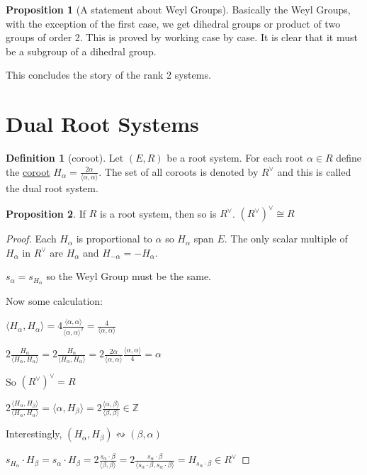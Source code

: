 \documentclass{article}
\theoremstyle{definition}
\newtheorem{definition}{Definition}
\newtheorem{proposition}{Proposition}
\begin{document}
\begin{proposition}
    [A statement about Weyl Groups] Basically the Weyl Groups, with the exception of the first case, we get dihedral groups or product of two groups of order 2. This is proved by working case by case. It is clear that it must be a subgroup of a dihedral group.
\end{proposition}

This concludes the story of the rank 2 systems.

\section*{Dual Root Systems}

\begin{definition}
    [coroot] Let \((E,R)\) be a root system. For each root \(\alpha \in R\) define the \underline{coroot} \(H_\alpha  = \frac{2\alpha}{\langle \alpha ,\alpha  \rangle }\). The set of all coroots is denoted by \(R^\vee\) and this is called the dual root system.
\end{definition}

\begin{proposition}
    If \(R\) is a root system, then so is \(R^\vee\). \((R^\vee)^\vee\cong R\)  
\end{proposition}

\begin{proof}
    Each \(H_\alpha \) is proportional to \(\alpha \) so \(H_\alpha \) span \(E\). The only scalar multiple of \(H_{\alpha} \) in \(R^\vee\) are \(H_\alpha \) and \(H_{-\alpha}=-H_\alpha\).

    \(s_\alpha = s_{H_\alpha}\) so the Weyl Group must be the same.

    Now some calculation:

    \(\langle H_\alpha ,H_\alpha \rangle = 4\frac{\langle \alpha ,\alpha  \rangle }{\langle \alpha ,\alpha  \rangle ^2}=\frac{4}{\langle \alpha ,\alpha  \rangle }\)
    
    \(2 \frac{H_\alpha}{\langle H_\alpha ,H_\alpha \rangle }= 2 \frac{H_\alpha}{\langle H_\alpha,H_\alpha \rangle }=2\frac{2\alpha}{\langle \alpha ,\alpha \rangle }\frac{\langle \alpha ,\alpha  \rangle }{4}=\alpha\) 

    So \((R^\vee)^\vee = R\)
    
    \(2\frac{\langle H_\alpha,H_\beta \rangle}{\langle H_\alpha ,H_\alpha \rangle }= \langle \alpha ,H_\beta \rangle = 2\frac{\langle \alpha ,\beta \rangle }{\langle \beta ,\beta  \rangle }\in\mathbb{Z}\) 

    Interestingly, \((H_\alpha ,H_\beta )\leftrightsquigarrow (\beta ,\alpha)\) 

    \(s_{H_\alpha}\cdot H_\beta =s_{\alpha}\cdot H_\beta=2\frac{s_\alpha \cdot \beta}{\langle \beta ,\beta  \rangle }=2 \frac{s_\alpha\cdot \beta}{\langle s_\alpha \cdot \beta , s_\alpha \cdot \beta \rangle }=H_{s_\alpha\cdot \beta}\in R^\vee\) 

\end{proof}
\end{document}
